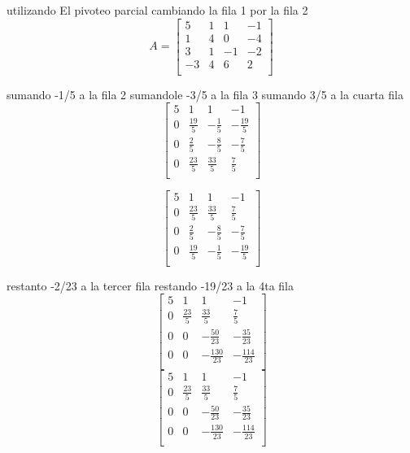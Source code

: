 \documentclass{article}
\begin{document}
utilizando El pivoteo parcial
cambiando la fila 1 por la fila 2
\[
    A=
    \begin{bmatrix}
        5 & 1 & 1 & -1   \\
        1 & 4 & 0 & -4   \\
        3 & 1 & -1 & -2   \\
        -3 & 4 & 6 & 2   \\
    \end{bmatrix}
\]

sumando -1/5 a la fila 2
sumandole -3/5 a la fila 3
sumando 3/5 a la cuarta fila
\[
    \begin{bmatrix}
        5 & 1 & 1 & -1   \\
        0 & \frac{19}{5}  & -\frac{1}{5} & -\frac{19}{5}   \\
        0 & \frac{2}{5} & -\frac{8}{5} & -\frac{7}{5}   \\
        0 & \frac{23}{5} & \frac{33}{5} & \frac{7}{5}   \\
    \end{bmatrix}
\]

\[
    \begin{bmatrix}
        5 & 1 & 1 & -1   \\
        0 & \frac{23}{5} & \frac{33}{5} & \frac{7}{5}   \\
        0 & \frac{2}{5} & -\frac{8}{5} & -\frac{7}{5}   \\
        0 & \frac{19}{5}  & -\frac{1}{5} & -\frac{19}{5}   \\
    \end{bmatrix}
\]

restanto -2/23 a la tercer fila
restando -19/23 a la 4ta fila
\[
    \begin{bmatrix}
        5 & 1 & 1 & -1   \\
        0 & \frac{23}{5} & \frac{33}{5} & \frac{7}{5}   \\
        0 & 0 & -\frac{50}{23} & -\frac{35}{23}   \\
        0 & 0  & -\frac{130}{23} & -\frac{114}{23}   \\
    \end{bmatrix}
\]
\[
    \begin{bmatrix}
        5 & 1 & 1 & -1   \\
        0 & \frac{23}{5} & \frac{33}{5} & \frac{7}{5}   \\
        0 & 0 & -\frac{50}{23} & -\frac{35}{23}   \\
        0 & 0  & -\frac{130}{23} & -\frac{114}{23}   \\
    \end{bmatrix}
\]
\end{document}
